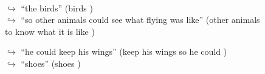 \documentclass[11pt,a4paper, onecolumn]{article}
\begin{document}
\begin{figure}[t]
\begin{tcolorbox}[boxsep=0pt,left=5pt,right=0pt,top=2pt,colback = yellow!5]
\begin{dialogue}
\\
\colorbox{pink!25}{$\hookrightarrow$}
{ ``the birds'' (birds ) }
\\
\colorbox{pink!25}{$\hookrightarrow$}
{ ``so other animals could see what flying was like'' (other animals to know what it is like ) }
\\
 \end{dialogue}\end{tcolorbox}\end{figure}\begin{figure}[t] \small \begin{tcolorbox}[boxsep=0pt,left=5pt,right=0pt,top=2pt,colback = yellow!5] \begin{dialogue}
 \small 
\colorbox{pink!25}{$\hookrightarrow$}
{ ``he could keep his wings'' (keep his wings so he could ) }
\\
\colorbox{pink!25}{$\hookrightarrow$}
{ ``shoes'' (shoes ) }
\\
 \end{dialogue}\end{tcolorbox}\end{figure}
\end{document}
